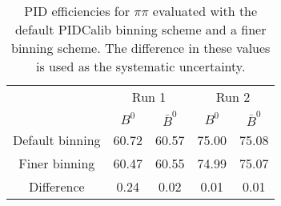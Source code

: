 \begin{table}
    \centering
    \begin{tabular}{ccccc}
    \toprule
& \multicolumn{2}{c}{Run 1} & \multicolumn{2}{c}{Run 2}\\
& $B^0$ & $\bar{B}^0$ & $B^0$ & $\bar{B}^0$\\
    \midrule
Default binning & 60.72 & 60.57 & 75.00 & 75.08\\
Finer binning & 60.47 & 60.55 & 74.99 & 75.07\\
Difference & 0.24 & 0.02 & 0.01 & 0.01\\
    \bottomrule
    \end{tabular}
    \caption{PID efficiencies for $\pi\pi$ evaluated with the default PIDCalib binning scheme and a finer binning scheme. The difference in these values is used as the systematic uncertainty.}
\label{tab:final_PID_pipi}
\end{table}
